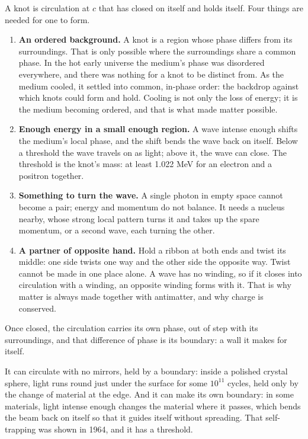 \documentclass[11pt,a4paper]{article}
\begin{document}
\begin{hypbar}
A knot is circulation at $c$ that has closed on itself and holds itself. Four things are needed for one to form.
\begin{enumerate}
\item \textbf{An ordered background.} A knot is a region whose phase differs from its surroundings. That is only possible where the surroundings share a common phase. In the hot early universe the medium's phase was disordered everywhere, and there was nothing for a knot to be distinct from. As the medium cooled, it settled into common, in-phase order: the backdrop against which knots could form and hold. Cooling is not only the loss of energy; it is the medium becoming ordered, and that is what made matter possible.
\item \textbf{Enough energy in a small enough region.} A wave intense enough shifts the medium's local phase, and the shift bends the wave back on itself. Below a threshold the wave travels on as light; above it, the wave can close. The threshold is the knot's mass: at least 1.022 MeV for an electron and a positron together.
\item \textbf{Something to turn the wave.} A single photon in empty space cannot become a pair; energy and momentum do not balance. It needs a nucleus nearby, whose strong local pattern turns it and takes up the spare momentum, or a second wave, each turning the other.
\item \textbf{A partner of opposite hand.} Hold a ribbon at both ends and twist its middle: one side twists one way and the other side the opposite way. Twist cannot be made in one place alone. A wave has no winding, so if it closes into circulation with a winding, an opposite winding forms with it. That is why matter is always made together with antimatter, and why charge is conserved.
\end{enumerate}
Once closed, the circulation carries its own phase, out of step with its surroundings, and that difference of phase is its boundary: a wall it makes for itself.
\end{hypbar}

 It can circulate with no mirrors, held by a boundary: inside a polished crystal sphere, light runs round just under the surface for some $10^{11}$ cycles, held only by the change of material at the edge. And it can make its own boundary: in some materials, light intense enough changes the material where it passes, which bends the beam back on itself so that it guides itself without spreading. That self-trapping was shown in 1964, and it has a threshold. 
\end{document}
